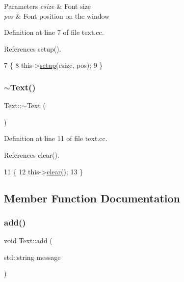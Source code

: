 \begin{DoxyParams}{Parameters}
{\em csize} & Font size \\
\hline
{\em pos} & Font position on the window \\
\hline
\end{DoxyParams}


Definition at line 7 of file text.\+cc.



References setup().


\begin{DoxyCode}
7                                     \{
8     this->\hyperlink{class_text_afde89d05e0de0f17092b8c56e6ac77df}{setup}(csize, pos);
9 \}
\end{DoxyCode}
\mbox{\label{class_text_a2d49e5c280e205125b149f7777ae30c7}} 
\subsubsection{\texorpdfstring{$\sim$\+Text()}{~Text()}}
{\footnotesize\ttfamily Text\+::$\sim$\+Text (\begin{DoxyParamCaption}{ }\end{DoxyParamCaption})}



Definition at line 11 of file text.\+cc.



References clear().


\begin{DoxyCode}
11             \{
12     this->\hyperlink{class_text_a7dacbbf887593bff5a5e45cde06dca71}{clear}();
13 \}
\end{DoxyCode}


\subsection{Member Function Documentation}
\mbox{\label{class_text_ab5f6fabb3e5e029ed0e42d21757c9521}} 
\subsubsection{\texorpdfstring{add()}{add()}}
{\footnotesize\ttfamily void Text\+::add (\begin{DoxyParamCaption}\item[{std\+::string}]{message }\end{DoxyParamCaption})}



